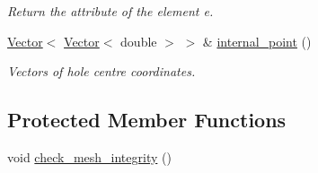 \begin{DoxyCompactItemize}
\begin{DoxyCompactList}\small\item\em Return the attribute of the element e. \end{DoxyCompactList}\item 
\hyperlink{classoomph_1_1Vector}{Vector}$<$ \hyperlink{classoomph_1_1Vector}{Vector}$<$ double $>$ $>$ \& \hyperlink{classoomph_1_1TriangleScaffoldMesh_a6323e0c376f978c899c3a8c5f36be7b8}{internal\+\_\+point} ()
\begin{DoxyCompactList}\small\item\em Vectors of hole centre coordinates. \end{DoxyCompactList}\end{DoxyCompactItemize}
\subsection*{Protected Member Functions}
\begin{DoxyCompactItemize}
\item 
void \hyperlink{classoomph_1_1TriangleScaffoldMesh_a56af4394a96d57f9d0aa1974a4ead8b2}{check\+\_\+mesh\+\_\+integrity} ()
\end{DoxyCompactItemize}
